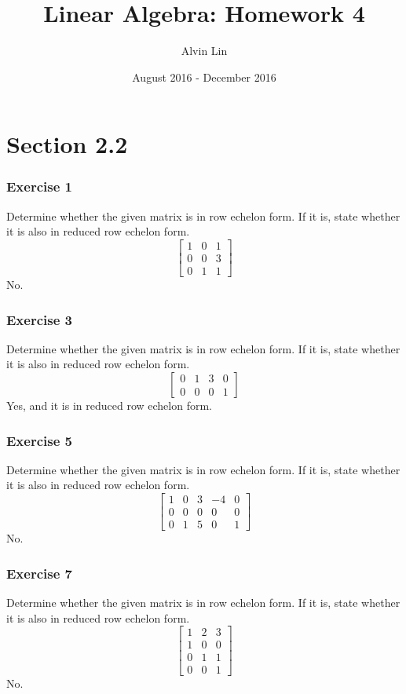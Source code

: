 \documentclass{math}
\title{Linear Algebra: Homework 4}
\author{Alvin Lin}
\date{August 2016 - December 2016}
\begin{document}
\maketitle

\section*{Section 2.2}

\subsubsection*{Exercise 1}
Determine whether the given matrix is in row echelon form. If it is, state
whether it is also in reduced row echelon form.
\[ \begin{bmatrix}
  1 & 0 & 1 \\
  0 & 0 & 3 \\
  0 & 1 & 1
\end{bmatrix} \]
No.

\subsubsection*{Exercise 3}
Determine whether the given matrix is in row echelon form. If it is, state
whether it is also in reduced row echelon form.
\[ \begin{bmatrix}
  0 & 1 & 3 & 0 \\
  0 & 0 & 0 & 1
\end{bmatrix} \]
Yes, and it is in reduced row echelon form.

\subsubsection*{Exercise 5}
Determine whether the given matrix is in row echelon form. If it is, state
whether it is also in reduced row echelon form.
\[ \begin{bmatrix}
  1 & 0 & 3 & -4 & 0 \\
  0 & 0 & 0 & 0 & 0 \\
  0 & 1 & 5 & 0 & 1
\end{bmatrix} \]
No.

\subsubsection*{Exercise 7}
Determine whether the given matrix is in row echelon form. If it is, state
whether it is also in reduced row echelon form.
\[ \begin{bmatrix}
  1 & 2 & 3 \\
  1 & 0 & 0 \\
  0 & 1 & 1 \\
  0 & 0 & 1
\end{bmatrix} \]
No.
\end{document}
